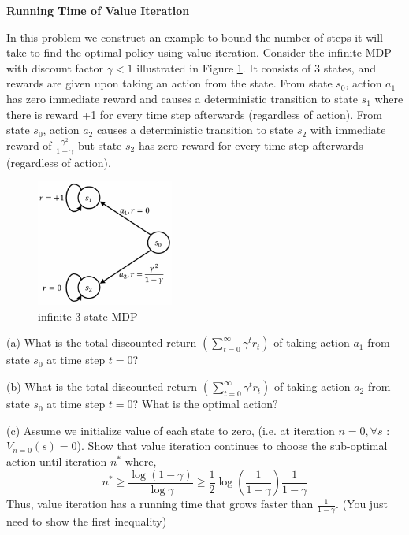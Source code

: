 \begin{homeworkProblem}

\textbf{Running Time of Value Iteration}

In this problem we construct an example to bound the number of steps it will take to find the optimal policy using value iteration. Consider the infinite MDP with discount factor $\gamma<1$ illustrated in Figure \ref{fig:value_iteration}. It consists of 3 states, and rewards are given upon taking an action from the state. From state $s_0$, action $a_1$ has zero immediate reward and causes a deterministic transition to state $s_1$ where there is reward +1 for every time step afterwards (regardless of action). From state $s_0$, action $a_2$ causes a deterministic transition to state $s_2$ with immediate reward of $\frac{\gamma^2}{1-\gamma}$ but state $s_2$ has zero reward for every time step afterwards (regardless of action).
\begin{figure}[h]
    \centering
    \includegraphics[width=0.4\textwidth]{./figure/value_iteration.png}
    \caption{infinite 3-state MDP}
    \label{fig:value_iteration}
\end{figure}

(a) What is the total discounted return $\left(\sum\limits_{t=0}^{\infty} \gamma^t r_t\right)$ of taking action $a_1$ from state $s_0$ at time step $t=0$?

(b) What is the total discounted return $\left(\sum\limits_{t=0}^{\infty} \gamma^t r_t\right)$ of taking action $a_2$ from state $s_0$ at time step $t=0$? What is the optimal action?

(c) Assume we initialize value of each state to zero, (i.e. at iteration $n=0, \forall s$ : $V_{n=0}(s)=0$). Show that value iteration continues to choose the sub-optimal action until iteration $n^*$ where,
$$n^* \geq \frac{\log (1-\gamma)}{\log \gamma} \geq \frac{1}{2} \log \left(\frac{1}{1-\gamma}\right) \frac{1}{1-\gamma}$$
Thus, value iteration has a running time that grows faster than $\frac{1}{1-\gamma}$. (You just need to show the first inequality)


\end{homeworkProblem}
